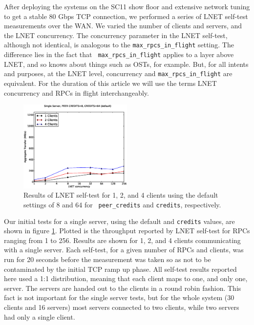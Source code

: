 \documentclass[]{sig-alternate}
\begin{document}
After deploying the systems on the SC11 show floor and extensive network tuning to get a stable 80 Gbps TCP
connection, we performed a series of LNET self-test measurements over the WAN. We varied the number of clients
and servers, and the LNET concurrency. The concurrency parameter in the LNET self-test, although not
identical, is analogous to the {\tt max\_rpcs\_in\_flight} setting. The difference lies in the fact that {\tt
  max\_rpcs\_in\_flight} applies to a layer above LNET, and so knows about things such as OSTs, for example. But,
for all intents and purposes, at the LNET level, concurrency and {\tt max\_rpcs\_in\_flight} are
equivalent. For the duration of this article we will use the terms LNET concurrency and RPCs in flight
interchangeably.  

\begin{figure}
\centering
\includegraphics[width=0.50\textwidth]{figures/default_pc_plot.eps}
\caption{Results of LNET self-test for 1, 2, and 4 clients using the default settings of 8 and 64 for {\tt
    peer\_credits} and {\tt credits}, respectively.}
\label{fig:default}
\end{figure}

Our initial tests for a single server, using the default  and {\tt credits} values, are
shown in figure \ref{fig:default}. Plotted is the throughput reported by LNET self-test for RPCs ranging from
1 to 256. Results are shown for 1, 2, and 4 clients communicating with a single server. Each self-test, for
a given number of RPCs and clients, was run for 20 seconds before the measurement was taken so as not to be
contaminated by the initial TCP ramp up phase. All self-test results reported here used a 1:1 distribution,
meaning that each client maps to one, and only one, server. The servers are handed out to the clients in a
round robin fashion. This fact is not important for the single server tests, but for the whole system (30
clients and 16 servers) most servers connected to two clients, while two servers had only a single client.
\end{document}

